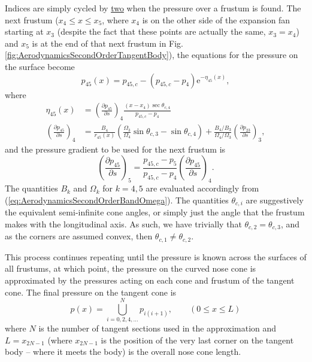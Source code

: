 \documentclass[11pt,dvipsnames]{thesis}
\begin{document}
Indices are simply cycled by \underline{two} when the pressure over a frustum is found. The next frustum ($x_4 \leqslant x \leqslant x_5$, where $x_4$ is on the other side of the expansion fan starting at $x_3$ (despite the fact that these points are actually the same, $x_3 = x_4$) and $x_5$ is at the end of that next frustum in Fig. \ref{fig:AerodynamicsSecondOrderTangentBody}), the equations for the pressure on the surface become
\begin{equation}
p_{45}(x) = p_{45,c} - (p_{45,c} - p_4) \mathrm{e}^{-\eta_{45}(x)},
\end{equation}
where 
\begin{align}
\eta_{45}(x) &= \left(\frac{\partial p_{45}}{\partial s}\right)_{\!4} \frac{(x - x_4) \sec\theta_{c,4}}{p_{45,c} - p_4} \\
\left(\frac{\partial p_{45}}{\partial s}\right)_{\!4} &= \frac{B_4}{r_{45}(x)}\left(\frac{\Omega_3}{\Omega_4} \sin\theta_{c,3} - \sin\theta_{c,4}\right) + \frac{B_4/B_3}{\Omega_4 / \Omega_3} \left(\frac{\partial p_{23}}{\partial s}\right)_{\!3},
\end{align}
and the pressure gradient to be used for the next frustum is
\begin{equation}
\left(\frac{\partial p_{45}}{\partial s}\right)_{\!5} = \frac{p_{45,c} - p_5}{p_{45,c} - p_4} \left(\frac{\partial p_{45}}{\partial s}\right)_{\!4}.
\end{equation}
The quantities $B_k$ and $\Omega_k$ for $k = 4,5$ are evaluated accordingly from (\ref{eq:AerodynamicsSecondOrderBandOmega}). 
The quantities $\theta_{c,i}$ are suggestively the equivalent semi-infinite cone angles, or simply just the angle that the frustum makes with the longitudinal axis. As such, we have trivially that $\theta_{c,2} = \theta_{c,3}$, and as the corners are assumed convex, then $\theta_{c,1} \neq \theta_{c,2}$.

This process continues repeating until the pressure is known across the surfaces of all frustums, at which point, the pressure on the curved nose cone is approximated by the pressures acting on each cone and frustum of the tangent cone.
The final pressure on the tangent cone is 
\begin{equation}
p(x) = \bigcup_{i=0,2,4,\ldots}^N p_{i(i+1)}, \qquad (0 \leqslant x \leqslant L)
\end{equation}
where $N$ is the number of tangent sections used in the approximation and $L = x_{2N - 1}$ (where $x_{2N - 1}$ is the position of the very last corner on the tangent body -- where it meets the body) is the overall nose cone length.
\end{document}
